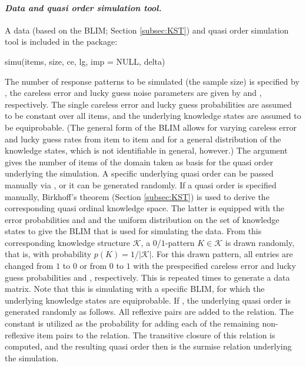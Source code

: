 \documentclass[nojss]{jss}
\begin{document}
\paragraph{\it Data and quasi order simulation tool.}
A data (based on the BLIM; Section \ref{subsec:KST}) and quasi order simulation tool 
is included in the package:
\begin{Code}
simu(items, size, ce, lg, imp = NULL, delta)
\end{Code}
The number of response patterns to be simulated (the sample size) is specified by , the careless error and lucky guess noise parameters are given
by  and , respectively. 
The single careless error  and lucky guess  probabilities are assumed to be 
constant over all items, and the underlying knowledge states are assumed to be equiprobable.
(The general form of the BLIM allows for varying careless error and lucky guess rates from item 
to item and for a general distribution of the knowledge states, which is not identifiable in general, however.) The argument  gives the number of items of the domain taken as basis 
for the quasi order underlying the simulation. A specific underlying quasi order can be passed manually via , or it can be generated randomly. If a quasi order is specified manually,
Birkhoff's theorem (Section \ref{subsec:KST}) is used to derive the corresponding quasi ordinal knowledge space. The latter is equipped with the error probabilities  and  
and the uniform distribution on the set of knowledge states to give the BLIM that is used for simulating the data.
From this corresponding knowledge structure $\mathcal{K}$, 
a $0$/$1$-pattern $K\in\mathcal{K}$ is drawn randomly, that is, with probability 
$p(K)=1/|\mathcal{K}|$. For this drawn pattern, all entries are changed from $1$ to $0$ 
or from $0$ to $1$ with the prespecified careless error and lucky guess probabilities 
and , respectively. This is repeated  times to generate a 
data matrix. Note that this is simulating with a specific BLIM, for which the underlying 
knowledge states are equiprobable.
If , the underlying quasi order is generated randomly as follows. 
All reflexive pairs are added to the relation. The constant  is utilized as the probability 
for adding each of the remaining non-reflexive item pairs to the relation. 
The transitive closure of this relation is computed, and the resulting quasi order then is the surmise relation underlying the simulation.
\end{document}
